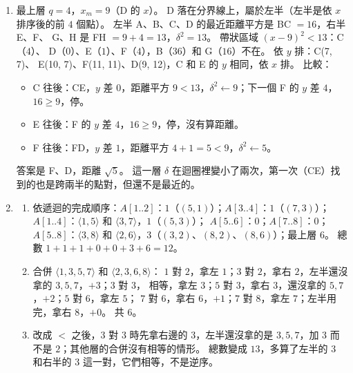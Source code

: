 \begin{enumerate}
\item 最上層 $q = 4$，$x_m = 9$（D 的 $x$）。 D 落在分界線上，屬於左半（左半是依
$x$ 排序後的前 $4$ 個點）。 左半 A、B、C、D 的最近距離平方是 BC $= 16$，右半 E、F、
G、H 是 FH $= 9 + 4 = 13$，$\delta^2 = 13$。 帶狀區域 $(x - 9)^2 < 13$：C（$4$）、
D（$0$）、E（$1$）、F（$4$），B（$36$）和 G（$16$）不在。 依 $y$ 排：C(7, 7)、
E(10, 7)、F(11, 11)、D(9, 12)，C 和 E 的 $y$ 相同，依 $x$ 排。 比較：
\begin{itemize}
\item C 往後：CE，$y$ 差 $0$，距離平方 $9 < 13$，$\delta^2 \gets 9$；下一個 F 的
$y$ 差 $4$，$16 \ge 9$，停。
\item E 往後：F 的 $y$ 差 $4$，$16 \ge 9$，停，沒有算距離。
\item F 往後：FD，$y$ 差 $1$，距離平方 $4 + 1 = 5 < 9$，$\delta^2 \gets 5$。
\end{itemize}
答案是 F、D，距離 $\sqrt{5}$。 這一層 $\delta$ 在迴圈裡變小了兩次，第一次（CE）找
到的也是跨兩半的點對，但還不是最近的。

\item
\begin{enumerate}
\item 依遞迴的完成順序：$A[1..2]$：$1$（$(5, 1)$）；$A[3..4]$：$1$（$(7, 3)$）；
$A[1..4]$：$\langle 1, 5 \rangle$ 和 $\langle 3, 7 \rangle$，$1$（$(5, 3)$）；
$A[5..6]$：$0$；$A[7..8]$：$0$；$A[5..8]$：$\langle 3, 8 \rangle$ 和
$\langle 2, 6 \rangle$，$3$（$(3, 2)$、$(8, 2)$、$(8, 6)$）；最上層 $6$。 總數
$1 + 1 + 1 + 0 + 0 + 3 + 6 = 12$。
\item 合併 $\langle 1, 3, 5, 7 \rangle$ 和 $\langle 2, 3, 6, 8 \rangle$：
$1$ 對 $2$，拿左 $1$；$3$ 對 $2$，拿右 $2$，左半還沒拿的 $3, 5, 7$，$+3$；$3$ 對 $3$，
相等，拿左 $3$；$5$ 對 $3$，拿右 $3$，還沒拿的 $5, 7$，$+2$；$5$ 對 $6$，拿左 $5$；
$7$ 對 $6$，拿右 $6$，$+1$；$7$ 對 $8$，拿左 $7$；左半用完，拿右 $8$，$+0$。 共
$6$。
\item 改成 $<$ 之後，$3$ 對 $3$ 時先拿右邊的 $3$，左半還沒拿的是 $3, 5, 7$，加 $3$
而不是 $2$；其他層的合併沒有相等的情形。 總數變成 $13$，多算了左半的 $3$ 和右半的
$3$ 這一對，它們相等，不是逆序。
\end{enumerate}


\end{enumerate}
